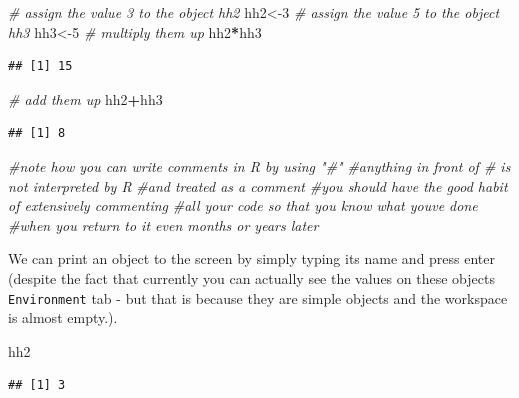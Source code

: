 \documentclass[
]{article}
\newenvironment{Shaded}{\begin{snugshade}}{\end{snugshade}}
\newcommand{\CommentTok}[1]{\textcolor[rgb]{0.56,0.35,0.01}{\textit{#1}}}
\newcommand{\DecValTok}[1]{\textcolor[rgb]{0.00,0.00,0.81}{#1}}
\newcommand{\NormalTok}[1]{#1}
\newcommand{\OtherTok}[1]{\textcolor[rgb]{0.56,0.35,0.01}{#1}}
\newcommand{\SpecialCharTok}[1]{\textcolor[rgb]{0.81,0.36,0.00}{\textbf{#1}}}
\begin{document}
\begin{Shaded}
\begin{Highlighting}[]
\CommentTok{\# assign the value 3 to the object hh2}
\NormalTok{hh2}\OtherTok{\textless{}{-}}\DecValTok{3}
\CommentTok{\# assign the value 5 to the object hh3}
\NormalTok{hh3}\OtherTok{\textless{}{-}}\DecValTok{5}
\CommentTok{\# multiply them up}
\NormalTok{hh2}\SpecialCharTok{*}\NormalTok{hh3}
\end{Highlighting}
\end{Shaded}

\begin{verbatim}
## [1] 15
\end{verbatim}

\begin{Shaded}
\begin{Highlighting}[]
\CommentTok{\# add them up}
\NormalTok{hh2}\SpecialCharTok{+}\NormalTok{hh3}
\end{Highlighting}
\end{Shaded}

\begin{verbatim}
## [1] 8
\end{verbatim}

\begin{Shaded}
\begin{Highlighting}[]
\CommentTok{\#note how you can write comments in R by using "\#"}
\CommentTok{\#anything in front of \# is not interpreted by R}
\CommentTok{\#and treated as a comment}
\CommentTok{\#you should have the good habit of extensively commenting}
\CommentTok{\#all your code so that you know what you\textquotesingle{}ve done}
\CommentTok{\#when you return to it even months or years later}
\end{Highlighting}
\end{Shaded}

We can print an object to the screen by simply typing its name and press
enter (despite the fact that currently you can actually see the values
on these objects \texttt{Environment} tab - but that is because they are
simple objects and the workspace is almost empty.).

\begin{Shaded}
\begin{Highlighting}[]
\NormalTok{hh2}
\end{Highlighting}
\end{Shaded}

\begin{verbatim}
## [1] 3
\end{verbatim}
\end{document}
